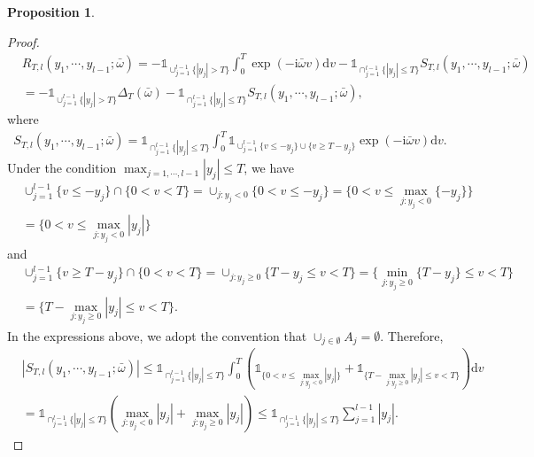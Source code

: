 \documentclass[11pt]{article}
\numberwithin{equation}{section}
\theoremstyle{plain}
\theoremstyle{definition}
\theoremstyle{definition}
\theoremstyle{assumption}
\theoremstyle{proposition}
\newtheorem{proposition}{Proposition}[section]
\theoremstyle{proposition}
\theoremstyle{example}
\theoremstyle{lemma}
\theoremstyle{theorem}
\theoremstyle{remark}
\begin{document}
\begin{proposition}
\begin{proof}
\begin{align*}
&R_{T,l}(y_1,\cdots,y_{l-1}; \bar{\omega})
=-\mathds{1}_{\cup_{j=1}^{l-1}\{|y_j|>T\}}\int_0^T \exp\left(-\mathrm{i}\bar{\omega}v \right)\mathrm{d}v 
-\mathds{1}_{\cap_{j=1}^{l-1} \{|y_j| \leqslant T\}}S_{T,l}(y_1,\cdots,y_{l-1};\bar{\omega}) \\
&=-\mathds{1}_{\cup_{j=1}^{l-1}\{|y_j|>T\}}\Delta_T\left(\bar{\omega}\right)
-\mathds{1}_{\cap_{j=1}^{l-1} \{|y_j| \leqslant T\}}S_{T,l}(y_1,\cdots,y_{l-1};\bar{\omega}) ,
\end{align*}
where
\begin{align*}
S_{T,l}(y_1,\cdots,y_{l-1};\bar{\omega}) = \mathds{1}_{\cap_{j=1}^{l-1} \{|y_j| \leqslant T\}}\int_0^T \mathds{1}_{\cup_{j=1}^{l-1} \{v \leqslant -y_j\}\cup\{v \geqslant T - y_j\}}  \exp\left(-\mathrm{i}\bar{\omega}v \right)\mathrm{d}v .
\end{align*}
Under the condition $\max_{j=1,\cdots,l-1}|y_j|\leqslant T$, we have
\begin{align*}
&\cup_{j=1}^{l-1} \{v \leqslant -y_j\}\cap\{0<v<T\} = \cup_{j: y_j<0}\{0<v\leqslant-y_j\} = \{0<v\leqslant\max_{j:y_j<0}\{-y_j\}\} \\
&=\{0<v\leqslant\max_{j:y_j<0}|y_j|\}
\end{align*}
and
\begin{align*}
&\cup_{j=1}^{l-1} \{v \geqslant T-y_j\}\cap\{0<v<T\} = \cup_{j: y_j\geqslant0}\{T-y_j\leqslant v<T\} = \{\min_{j:y_j\geqslant0}\{T-y_j\}\leqslant v<T\} \\
&=\{T-\max_{j:y_j\geqslant0}|y_j|\leqslant v<T\} .
\end{align*}
In the expressions above, we adopt the convention that $\cup_{j\in\emptyset}A_j = \emptyset$. Therefore,
\begin{align*}
&|S_{T,l}(y_1,\cdots,y_{l-1};\bar{\omega})|\leqslant \mathds{1}_{\cap_{j=1}^{l-1} \{|y_j| \leqslant T\}}\int_0^T \left(\mathds{1}_{\{0<v\leqslant\max_{j:y_j<0}|y_j|\}} +  \mathds{1}_{\{T-\max_{j:y_j\geqslant0}|y_j|\leqslant v<T\}}\right)\mathrm{d}v \\
&=\mathds{1}_{\cap_{j=1}^{l-1} \{|y_j| \leqslant T\}} \left(\max_{j:y_j<0}|y_j| + \max_{j:y_j\geqslant0}|y_j|\right)
\leqslant \mathds{1}_{\cap_{j=1}^{l-1} \{|y_j| \leqslant T\}}\sum_{j=1}^{l-1} |y_j|.
\end{align*}


\end{proof}
\end{proposition}
\end{document}
